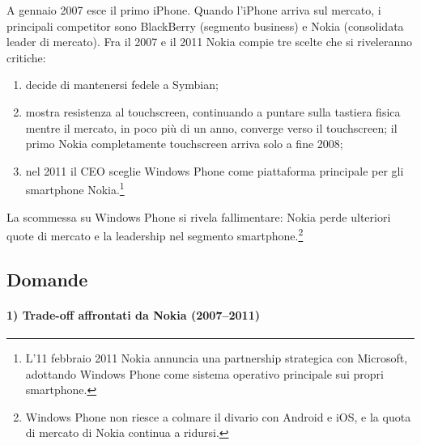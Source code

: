 \documentclass[a4paper,12pt]{article}
\begin{document}
	A gennaio 2007 esce il primo iPhone.%
	Quando l'iPhone arriva sul mercato, i principali competitor sono BlackBerry (segmento business) e Nokia (consolidata leader di mercato).%
	Fra il 2007 e il 2011 Nokia compie tre scelte che si riveleranno critiche:
	\begin{enumerate}
		\item decide di mantenersi fedele a Symbian;
		\item mostra resistenza al touchscreen, continuando a puntare sulla tastiera fisica mentre il mercato, in poco più di un anno, converge verso il touchscreen; il primo Nokia completamente touchscreen arriva solo a fine 2008;
		\item nel 2011 il CEO sceglie Windows Phone come piattaforma principale per gli smartphone Nokia.\footnote{L'11 febbraio 2011 Nokia annuncia una partnership strategica con Microsoft, adottando Windows Phone come sistema operativo principale sui propri smartphone. }
	\end{enumerate}
	La scommessa su Windows Phone si rivela fallimentare: Nokia perde ulteriori quote di mercato e la leadership nel segmento smartphone.\footnote{Windows Phone non riesce a colmare il divario con Android e iOS, e la quota di mercato di Nokia continua a ridursi. }
	
	\subsection*{Domande}
	
	\paragraph{1) Trade-off affrontati da Nokia (2007–2011)}
	
\end{document}
